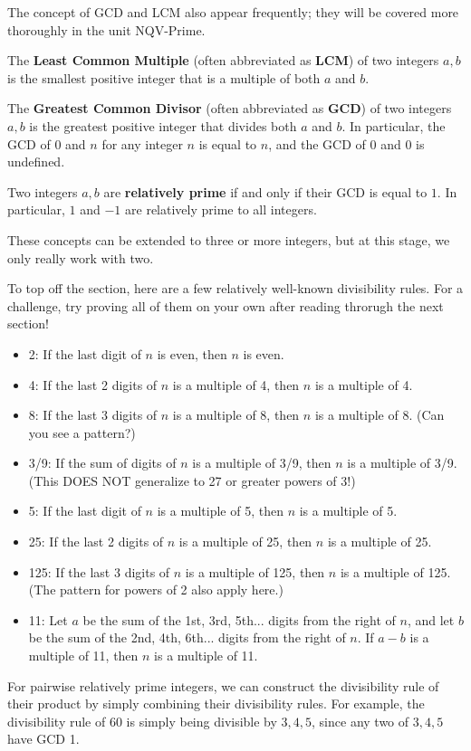\documentclass[mast]{lucky}
\begin{document}
\hfill

The concept of GCD and LCM also appear frequently; they will be covered more thoroughly in the unit NQV-Prime.

\begin{defi}
The \textbf{Least Common Multiple} (often abbreviated as \textbf{LCM}) of two integers $a,b$ is the smallest positive integer that is a multiple of both $a$ and $b$.

The \textbf{Greatest Common Divisor} (often abbreviated as \textbf{GCD}) of two integers $a,b$ is the greatest positive integer that divides both $a$ and $b$. In particular, the GCD of $0$ and $n$ for any integer $n$ is equal to $n$, and the GCD of $0$ and $0$ is undefined.

Two integers $a,b$ are \textbf{relatively prime} if and only if their GCD is equal to $1$. In particular, $1$ and $-1$ are relatively prime to all integers.
\end{defi}

These concepts can be extended to three or more integers, but at this stage, we only really work with two.

To top off the section, here are a few relatively well-known divisibility rules. For a challenge, try proving all of them on your own after reading throrugh the next section!
\begin{fact}
\hfill
\begin{itemize}
    \item 2: If the last digit of $n$ is even, then $n$ is even.
    \item 4: If the last 2 digits of $n$ is a multiple of 4, then $n$ is a multiple of 4.
    \item 8: If the last 3 digits of $n$ is a multiple of 8, then $n$ is a multiple of 8. (Can you see a pattern?)
    \item 3/9: If the sum of digits of $n$ is a multiple of 3/9, then $n$ is a multiple of 3/9. (This DOES NOT generalize to 27 or greater powers of 3!)
    \item 5: If the last digit of $n$ is a multiple of 5, then $n$ is a multiple of 5.
    \item 25: If the last 2 digits of $n$ is a multiple of 25, then $n$ is a multiple of 25.
    \item 125: If the last 3 digits of $n$ is a multiple of 125, then $n$ is a multiple of 125. (The pattern for powers of 2 also apply here.)
    \item 11: Let $a$ be the sum of the 1st, 3rd, 5th... digits from the right of $n$, and let $b$ be the sum of the 2nd, 4th, 6th... digits from the right of $n$. If $a-b$ is a multiple of 11, then $n$ is a multiple of 11.
\end{itemize}
For pairwise relatively prime integers, we can construct the divisibility rule of their product by simply combining their divisibility rules. For example, the divisibility rule of $60$ is simply being divisible by $3,4,5$, since any two of $3,4,5$ have GCD 1. 
\end{fact}
\end{document}
